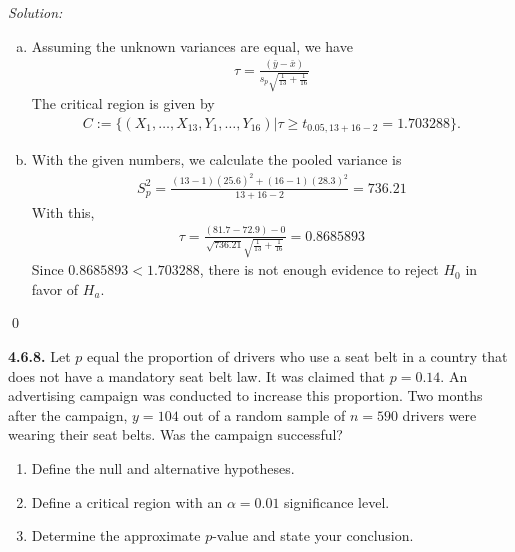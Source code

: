 \documentclass{book}
\theoremstyle{definition}
\newcommand{\al}{\alpha}
\newcommand{\f}[2]{\frac{#1}{#2}}
\begin{document}
\noindent \textit{Solution:}
\begin{enumerate}[(a)]
	\item Assuming the unknown variances are equal, we have
	\begin{align}
	\tau = \f{(\bar{y}-\bar{x})}{s_p\sqrt{\f{1}{13} + \f{1}{16}}}
	\end{align}
	The critical region is given by
	\begin{align}
	C := \{ (X_1,\dots,X_{13}, Y_1,\dots,Y_{16}) \vert \tau \geq t_{0.05,13+16-2} = \boxed{1.703288} \}.
	\end{align}
	
	
	\item With the given numbers, we calculate the pooled variance is
	\begin{align}
	S_p^2 = \f{(13-1)(25.6)^2 + (16-1)(28.3)^2}{13+16-2} = 736.21
	\end{align}
	With this,
	\begin{align}
	\tau = \f{(81.7 - 72.9) - 0}{\sqrt{736.21}\sqrt{\f{1}{13} + \f{1}{16}}} = \boxed{0.8685893}
	\end{align}
	Since $0.8685893 < 1.703288$, there is not enough evidence to reject $H_0$ in favor of $H_a$. 
\end{enumerate}\qed









\newpage
\noindent \textbf{4.6.8.} Let $p$ equal the proportion of drivers who use a seat belt in a country that
does not have a mandatory seat belt law. It was claimed that $p = 0.14$. An
advertising campaign was conducted to increase this proportion. Two months after
the campaign, $y = 104$ out of a random sample of $n = 590$ drivers were wearing
their seat belts. Was the campaign successful?
\begin{enumerate}
	\item Define the null and alternative hypotheses.
	\item Define a critical region with an $\al = 0.01$ significance level.
	\item Determine the approximate $p$-value and state your conclusion.
\end{enumerate}
\end{document}
